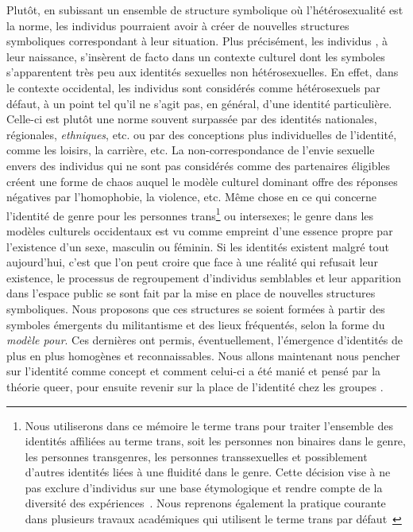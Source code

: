 Plutôt, en subissant un ensemble de structure symbolique où l'hétérosexualité est la norme, les individus \lgbt{} pourraient avoir à créer de nouvelles structures symboliques correspondant à leur situation.
Plus précisément, les individus \lgbt{}, à leur naissance, s'insèrent de facto dans un contexte culturel dont les symboles s'apparentent très peu aux identités sexuelles non hétérosexuelles.
En effet, dans le contexte occidental, les individus sont considérés comme hétérosexuels par défaut, à un point tel qu'il ne s'agit pas, en général, d'une identité particulière.
Celle-ci est plutôt une norme souvent surpassée par des identités nationales, régionales, \emph{ethniques}, etc. ou par des conceptions plus individuelles de l'identité, comme les loisirs, la carrière, etc.
La non-correspondance de l'envie sexuelle envers des individus qui ne sont pas considérés comme des partenaires éligibles créent une forme de chaos auquel le modèle culturel dominant offre des réponses négatives par l'homophobie, la violence, etc.
Même chose en ce qui concerne l'identité de genre pour les personnes trans\footnote{Nous utiliserons dans ce mémoire le terme trans pour traiter l'ensemble des identités affiliées au terme trans, soit les personnes non binaires dans le genre, les personnes transgenres, les personnes transsexuelles et possiblement d'autres identités liées à une fluidité dans le genre. Cette décision vise à ne pas exclure d'individus sur une base étymologique et rendre compte de la diversité des expériences~\citep[193]{Nash2011}. Nous reprenons également la pratique courante dans plusieurs travaux académiques qui utilisent le terme trans par défaut~\citep[par exemple, voir][]{Pfeffer2014, Rosenberg2014}} ou intersexes; le genre dans les modèles culturels occidentaux est vu comme empreint d'une essence propre par l'existence d'un sexe, masculin ou féminin.
Si les identités \lgbt{} existent malgré tout aujourd'hui, c'est que l'on peut croire que face à une réalité qui refusait leur existence, le processus de regroupement d'individus semblables et leur apparition dans l'espace public se sont fait par la mise en place de nouvelles structures symboliques.
Nous proposons que ces structures se soient formées à partir des symboles émergents du militantisme et des lieux fréquentés, selon la forme du \emph{modèle pour}.
Ces dernières ont permis, éventuellement, l'émergence d'identités de plus en plus homogènes et reconnaissables.
Nous allons maintenant nous pencher sur l'identité comme concept et comment celui-ci a été manié et pensé par la théorie queer, pour ensuite revenir sur la place de l'identité chez les groupes \lgbt{}.


